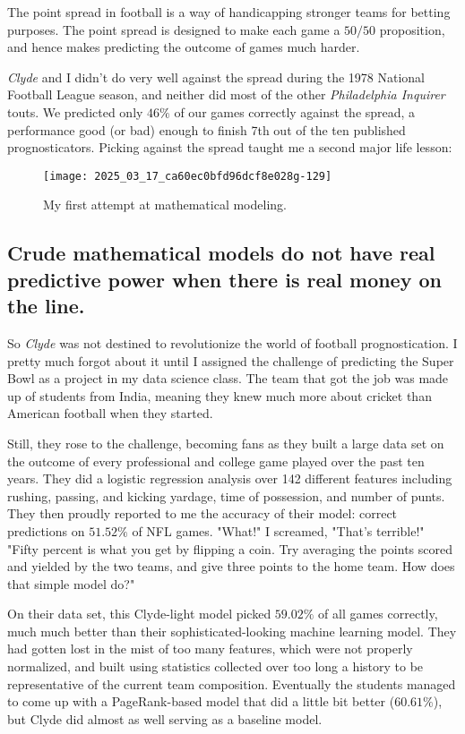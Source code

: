 \documentclass[10pt]{article}
\begin{document}
The point spread in football is a way of handicapping stronger teams for betting purposes. The point spread is designed to make each game a $50 / 50$ proposition, and hence makes predicting the outcome of games much harder.

\emph{Clyde} and I didn't do very well against the spread during the 1978 National Football League season, and neither did most of the other \emph{Philadelphia Inquirer} touts. We predicted only $46 \%$ of our games correctly against the spread, a performance good (or bad) enough to finish 7th out of the ten published prognosticators. Picking against the spread taught me a second major life lesson:

\begin{figure}[ht]
\centering
\texttt{[image: 2025\_03\_17\_ca60ec0bfd96dcf8e028g-129]}
\caption{My first attempt at mathematical modeling.}
\end{figure}

\subsection*{Crude mathematical models do not have real predictive power when there is real money on the line.}

So \emph{Clyde} was not destined to revolutionize the world of football prognostication. I pretty much forgot about it until I assigned the challenge of predicting the Super Bowl as a project in my data science class. The team that got the job was made up of students from India, meaning they knew much more about cricket than American football when they started.

Still, they rose to the challenge, becoming fans as they built a large data set on the outcome of every professional and college game played over the past ten years. They did a logistic regression analysis over 142 different features including rushing, passing, and kicking yardage, time of possession, and number of punts. They then proudly reported to me the accuracy of their model: correct predictions on $51.52 \%$ of NFL games.
"What!" I screamed, "That's terrible!" "Fifty percent is what you get by flipping a coin. Try averaging the points scored and yielded by the two teams, and give three points to the home team. How does that simple model do?"

On their data set, this Clyde-light model picked $59.02 \%$ of all games correctly, much much better than their sophisticated-looking machine learning model. They had gotten lost in the mist of too many features, which were not properly normalized, and built using statistics collected over too long a history to be representative of the current team composition. Eventually the students managed to come up with a PageRank-based model that did a little bit better ($60.61 \%$), but Clyde did almost as well serving as a baseline model.
\end{document}
